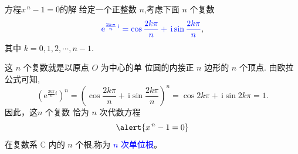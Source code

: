 \documentclass[13pt,punct]{ctexbeamer}
\def\e{\mathrm{e}}
\def\i{\, \mathrm{i}}
\newcommand{\blue}{\textcolor{blue}}
\begin{document}
\begin{frame}{方程$x^{\, n}-1=0$的解}
	给定一个正整数 $n$,考虑下面 $n$ 个复数
	\[
	\blue{{\e}^{\frac{2 k \pi }{n}{\i}}=\cos \frac{2 k \pi}{n}+\i\operatorname{sin} \frac{2 k \pi}{n}},
	\]
	其中 $k=0,1,2, \cdots, n-1.$

     这 $n$ 个复数就是以原点 $O$ 为中心的单 位圆的内接正 $n$ 边形的 $n$ 个顶点.
	由欧拉公式可知,
	\[
	\left({\e}^{\frac{2 {k\pi }}{n}i}\right)^{n}=\left(\cos \frac{2 k \pi}{n}+\i \operatorname{sin} \frac{2 k \pi}{n}\right)^{n}=\cos 2 k \pi+{\i} \sin 2 k \pi=1.
	\]
	因此，这$n$ 个复数
    恰为 $n$ 次代数方程 $$\alert{x^{\,n}-1=0}$$ 在复数系 $\mathbb{C}$ 内的 $n$ 个根,称为 \blue{$n$ 次单位根}。

\end{frame}

%
%
%
%
\end{document}
